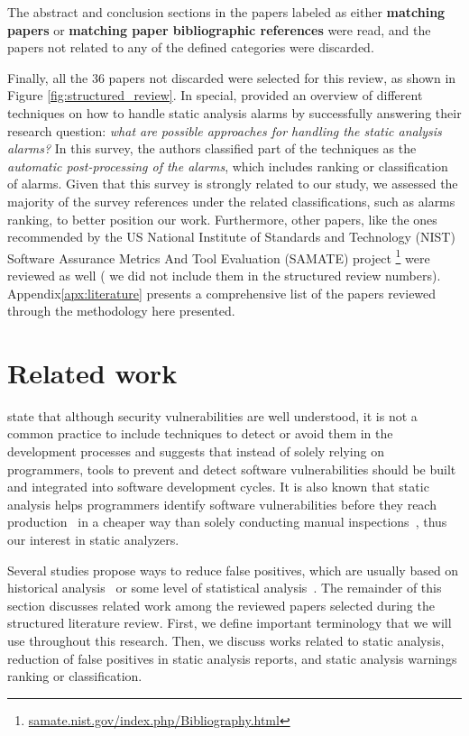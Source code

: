 The abstract and conclusion sections in the papers labeled as either
\textbf{matching papers} or \textbf{matching paper bibliographic references} were read, and the
papers not related to any of the defined categories were discarded.

Finally, all the 36 papers not discarded were selected for this review, as
shown in Figure \ref{fig:structured_review}. In special, \cite{muske2016survey} provided an overview of different techniques
on how to handle static analysis alarms by successfully answering their
research question: \textit{what are possible approaches for handling the static
analysis alarms?} In this survey, the authors classified part of the techniques
as the \textit{automatic post-processing of the alarms}, which includes ranking
or classification of alarms. Given that this survey is strongly related to our
study, we assessed the majority of the survey references under the related
classifications, such as alarms ranking, to better position our work.
Furthermore, other papers, like the ones recommended by the US National
Institute of Standards and Technology (NIST) Software Assurance Metrics And
Tool Evaluation (SAMATE) project
\footnote{\url{samate.nist.gov/index.php/Bibliography.html}} were reviewed as
well ( we did not include them in the structured review numbers).
Appendix\ref{apx:literature} presents a comprehensive list of the papers
reviewed through the methodology here presented.

\section{Related work}
\label{sec:related_work}

\cite{evans_improving_2002} state that although security vulnerabilities
are well understood, it is not a common practice to include techniques to detect
or avoid them in the development processes and suggests that instead of solely
relying on programmers, tools to prevent and detect software vulnerabilities
should be built and integrated into software development cycles. It is also
known that static analysis helps programmers identify software vulnerabilities
before they reach production~\citep{evans_improving_2002} in a cheaper way than
solely conducting manual inspections~\citep{johnson_why_2013}, thus our interest
in static analyzers.

Several studies propose ways to reduce false positives, which are usually based
on historical analysis~\citep{penta_evolution_2008, spacco_tracking_2006,
kim_which_2007} or some level of statistical analysis~\citep{muske2013review,
boogerd2006prioritizing, kremenek2003z, ruthruff_predicting_2008}. The
remainder of this section discusses related work among the reviewed papers
selected during the structured literature review. First, we define important
terminology that we will use throughout this research. Then, we discuss works
related to static analysis, reduction of false positives in static analysis
reports, and static analysis warnings ranking or classification.

